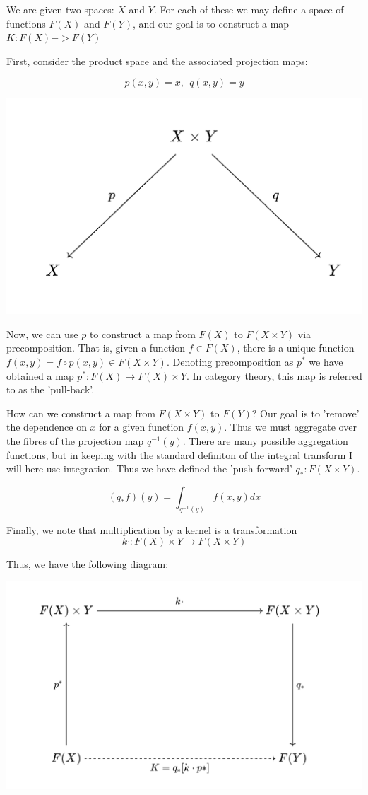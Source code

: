 \documentclass[11pt]{article}
\begin{document}
We are given two spaces: $X$ and $Y$. For each of these we may define a space of functions $F(X)$ and $F(Y)$, and our goal is to construct a map $K: F(X) -> F(Y)$

First, consider the product space and the associated projection maps:

$$ p(x, y) = x, \ \  q(x, y) = y$$

\pagebreak

\includegraphics[scale=0.4]{basic_span.png}

Now, we can use $p$ to construct a map from $F(X)$ to $F(X\times Y)$ via precomposition. That is, given a function $f \in F(X)$, there is a unique function $\tilde{f}(x,y) = f \circ p (x, y)  \in F(X \times Y)$. Denoting precomposition as $p^*$ we have obtained a map $p^*: F(X) \rightarrow F(X) \times Y$. In category theory, this map is referred to as the 'pull-back'.

How can we construct a map from $F(X \times Y)$ to $F(Y)$? Our goal is to 'remove' the dependence on $x$ for a given function $f(x, y)$. Thus we must aggregate over the fibres of the projection map $q^{-1}(y)$. There are many possible aggregation functions, but in keeping with the standard definiton of the integral transform I will here use integration. Thus we have defined the 'push-forward' $q_* : F(X \times Y)$.

$$ (q_* f)(y) = \int_{q^{-1}(y)} f(x, y) dx $$

Finally, we note that multiplication by a kernel is a transformation 
$$k \cdot : F(X) \times Y \rightarrow F(X \times Y)$$ 

Thus, we have the following diagram:

\includegraphics[scale=0.4]{integral_transform_diagram.png}
\end{document}

